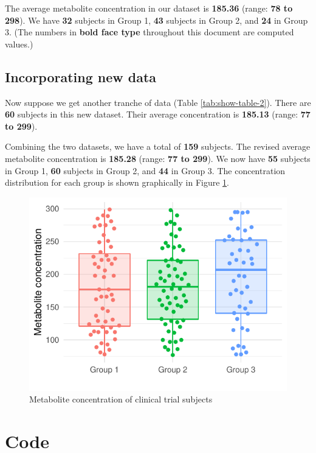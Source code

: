\documentclass[smallextended]{svjour3}       %
\begin{document}
The average metabolite concentration in our dataset is \textbf{185.36} (range: \textbf{78 to 298}). We have \textbf{32} subjects in Group 1, \textbf{43} subjects in Group 2, and \textbf{24} in Group 3. (The numbers in \textbf{bold face type} throughout this document are computed values.)

\hypertarget{sec:2}{%
\subsection{Incorporating new data}\label{sec:2}}

Now suppose we get another tranche of data (Table \ref{tab:show-table-2}). There are \textbf{60} subjects in this new dataset. Their average concentration is \textbf{185.13} (range: \textbf{77 to 299}).

Combining the two datasets, we have a total of \textbf{159} subjects. The revised average metabolite concentration is \textbf{185.28} (range: \textbf{77 to 299}). We now have \textbf{55} subjects in Group 1, \textbf{60} subjects in Group 2, and \textbf{44} in Group 3. The concentration distribution for each group is shown graphically in Figure \ref{fig:plot-data}.

\begin{figure}
\centering
\includegraphics{computed_manuscript_files/figure-latex/plot-data-1.pdf}
\caption{\label{fig:plot-data}Metabolite concentration of clinical trial subjects}
\end{figure}

\hypertarget{code}{%
\section{Code}\label{code}}
\end{document}
